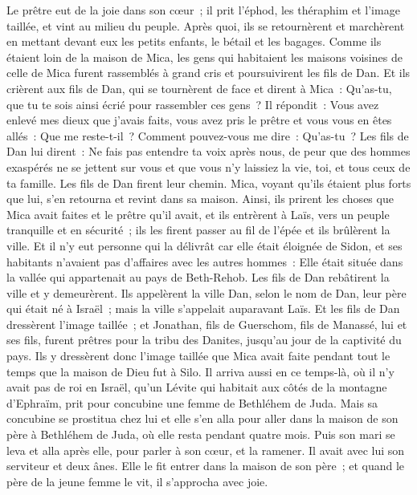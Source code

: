 \begin{multicols}{2}
Le prêtre eut de la joie dans son cœur~; il prit l'éphod, les théraphim et l'image taillée, et vint au milieu du peuple.
Après quoi, ils se retournèrent et marchèrent en mettant devant eux les petits enfants, le bétail et les bagages.
Comme ils étaient loin de la maison de Mica, les gens qui habitaient les maisons voisines de celle de Mica furent rassemblés à grand cris et poursuivirent les fils de Dan.
Et ils crièrent aux fils de Dan, qui se tournèrent de face et dirent à Mica~: Qu'as-tu, que tu te sois ainsi écrié pour rassembler ces gens~?
Il répondit~: Vous avez enlevé mes dieux que j'avais faits, vous avez pris le prêtre et vous vous en êtes allés~: Que me reste-t-il~? Comment pouvez-vous me dire~: Qu'as-tu~?
Les fils de Dan lui dirent~: Ne fais pas entendre ta voix après nous, de peur que des hommes exaspérés ne se jettent sur vous et que vous n'y laissiez la vie, toi, et tous ceux de ta famille.
Les fils de Dan firent leur chemin. Mica, voyant qu'ils étaient plus forts que lui, s'en retourna et revint dans sa maison.
Ainsi, ils prirent les choses que Mica avait faites et le prêtre qu'il avait, et ils entrèrent à Laïs, vers un peuple tranquille et en sécurité~; ils les firent passer au fil de l'épée et ils brûlèrent la ville.
Et il n'y eut personne qui la délivrât car elle était éloignée de Sidon, et ses habitants n'avaient pas d'affaires avec les autres hommes~: Elle était située dans la vallée qui appartenait au pays de Beth-Rehob. Les fils de Dan rebâtirent la ville et y demeurèrent.
Ils appelèrent la ville Dan, selon le nom de Dan, leur père qui était né à Israël~; mais la ville s'appelait auparavant Laïs.
Et les fils de Dan dressèrent l'image taillée~; et Jonathan, fils de Guerschom, fils de Manassé, lui et ses fils, furent prêtres pour la tribu des Danites, jusqu'au jour de la captivité du pays.
Ils y dressèrent donc l'image taillée que Mica avait faite pendant tout le temps que la maison de Dieu fut à Silo.
\VerseOne{}Il arriva aussi en ce temps-là, où il n'y avait pas de roi en Israël, qu'un Lévite qui habitait aux côtés de la montagne d'Ephraïm, prit pour concubine une femme de Bethléhem de Juda.
Mais sa concubine se prostitua chez lui et elle s'en alla pour aller dans la maison de son père à Bethléhem de Juda, où elle resta pendant quatre mois.
Puis son mari se leva et alla après elle, pour parler à son cœur, et la ramener. Il avait avec lui son serviteur et deux ânes. Elle le fit entrer dans la maison de son père~; et quand le père de la jeune femme le vit, il s'approcha avec joie.

\end{multicols}

